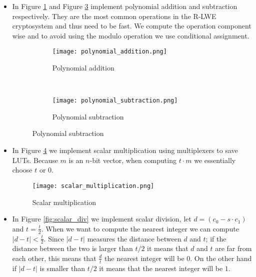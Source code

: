 \begin{itemize}

    \item
        In Figure \ref{fig:poly_add} and Figure \ref{fig:poly_sub} implement
        polynomial addition and subtraction respectively. They are the most
        common operations in the R-LWE cryptosystem and thus need to be fast.
        We compute the operation component wise and to avoid using the modulo
        operation we use conditional assignment.

        \begin{figure}[H]
            \centering
            \begin{subfigure}[b]{0.4\textwidth}
                \centering
                \texttt{[image: polynomial\_addition.png]}
                \caption{Polynomial addition
                \citep{FPGA_Post_Quantum_Primitives}}

                \label{fig:poly_add}
            \end{subfigure}
            ~
            \begin{subfigure}[b]{0.4\textwidth}
                \centering
                \texttt{[image: polynomial\_subtraction.png]}
                \caption{Polynomial subtraction
                \citep{FPGA_Post_Quantum_Primitives}}
                \label{fig:poly_sub}
            \end{subfigure}
        \end{figure}

    \item
        In Figure \ref{fig:scalar_mul} we implement scalar multiplication using
        multiplexers to save LUTs. Because $m$ is an $n$-bit vector, when
        computing $t\cdot m$ we essentially choose $t$ or $0$.

        \begin{figure}[H]
            \centering
            \texttt{[image: scalar\_multiplication.png]}
            \caption{Scalar multiplication \citep{FPGA_Post_Quantum_Primitives}}
            \label{fig:scalar_mul}
        \end{figure}

    \item
        In Figure \ref{fig:scalar_div} we implement scalar division, let
        $d = (c_0 - s \cdot c_1)$ and $t = \frac{t}{2}$. When we want to
        compute the nearest integer we can compute $|d - t| < \frac{t}{2}$.
        Since $|d - t|$ measures the distance between $d$ and $t$; if the
        distance between the two is larger than $t / 2$ it means that $d$ and
        $t$ are far from each other, this means that $\frac{d}{t}$ the nearest
        integer will be $0$. On the other hand if $|d - t|$ is smaller than $t
        / 2$ it means that the nearest integer will be $1$.



\end{itemize}
